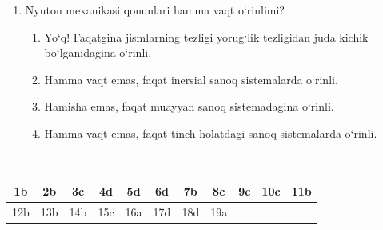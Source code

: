 \begin{enumerate}
\item Nyuton mexanikasi qonunlari hamma vaqt o‘rinlimi?
\begin{enumerate}[label=\Alph*)]
\item Yo‘q! Faqatgina jismlarning tezligi yorug‘lik tezligidan juda kichik bo‘lganidagina o‘rinli.
\item Hamma vaqt emas, faqat inersial sanoq sistemalarda o‘rinli.
\item Hamisha emas, faqat muayyan sanoq sistemadagina o‘rinli.
\item Hamma vaqt emas, faqat tinch holatdagi sanoq sistemalarda o‘rinli.
\end{enumerate}

\end{enumerate}\



\begin{table}[!ht]
\centering
\begin{tabular}{|c|c|c|c|c|c|c|c|c|c|c|}
\hline
1b & 2b & 3c & 4d & 5d & 6d & 7b & 8c & 9c & 10c & 11b \\ \hline
12b & 13b & 14b & 15c & 16a & 17d & 18d & 19a & & & \\ \hline
\end{tabular}
\end{table}
